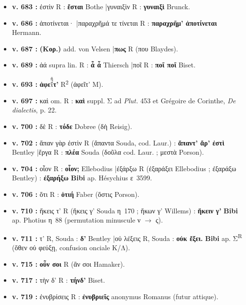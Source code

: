 \documentclass[10pt, a4paper, twoside]{book}
\renewcommand{\_}{\origunderscore\penalty0\relax}
\providecommand{\italique}[1]{\emph{#1}}
\providecommand{\lecon}[1]{\textbf{#1}}
\providecommand{\expo}[1]{\textsuperscript{#1}}
\providecommand{\Rdeux}{R\expo{2}}
\providecommand{\Mon}{M}
\providecommand{\espApp}{\hspace{0.5em}|\hspace{0.5em}}
\providecommand{\auDessus}[2]{\ensuremath{\overset{\text{#2}}{\text{#1}}}}
\begin{document}
\begin{itemize}
\begin{itemize}
    \item \textbf{v. 683 :} ἐστὶν R : \lecon{ἔσται} Bothe \espApp γυναιξὶν R : \lecon{γυναιξὶ} Brunck.
    \item \textbf{v. 686 :} ἀποτίνεται· \espApp παραχρῆμά τε τίνεται R : \lecon{παραχρῆμ' ἀποτίνεται} Hermann.
    \item \textbf{v. 687 :} \lecon{(Κορ.)} add. von Velsen \espApp \lecon{πως} R (που Blaydes).
    \item \textbf{v. 689 :} ἀά supra lin. R : \lecon{ἆ ἆ} Thiersch \espApp ποῖ R : \lecon{ποῖ ποῖ} Biset.
    \item \textbf{v. 693 :} \lecon{ἀφε\auDessus{ῖ}{ῆ}τ'} \Rdeux{} (ἀφεῖτ' \Mon{}).
    \item \textbf{v. 697 :} καὶ om. R : \lecon{καὶ} suppl. Σ ad \italique{Plut.} 453 et Grégoire de Corinthe, \italique{De dialectis}, p. 22.
    \item \textbf{v. 700 :} δὲ R : \lecon{τόδε} Dobree (δὴ Reisig).
    \item \textbf{v. 702 :} ἅπαν γὰρ ἐστὶν R (ἅπαντα Souda, cod. Laur.) : \lecon{ἅπαντ' ἄρ' ἐστὶ} Bentley \espApp ἔργα R : \lecon{πλέα} Souda (δοῦλα cod. Laur. ; μεστὰ Porson).
    \item \textbf{v. 704 :} οἷον R : \lecon{οἷον;} Ellebodius \espApp ἐξάρξω R (ἐξαράξει Ellebodius ; ἐξαράξω Bentley) : \lecon{ἐξαρήξω} \lecon{Bibi} ap. Hésychius ε~3599.
    \item \textbf{v. 706 :} ὅτι R : \lecon{ὁτιή} Faber (ὅστις Porson).
    \item \textbf{v. 710 :} ἥκεις τ' R (ἥκεις γ' Souda η~170 ; ἥκων γ' Willems) : \lecon{ἥκειν γ'} \lecon{Bibi} ap. Photius η~88 (permutation minuscule ν $\to$ ς).
    \item \textbf{v. 711 :} τ' R, Souda : \lecon{δ'} Bentley \espApp οὐ λέξεις R, Souda : \lecon{οὐκ ἔξει.} \lecon{Bibi} ap. Σ\textsuperscript{R} (ὅθεν οὐ φεύξῃ, confusion onciale Κ/Λ).
    \item \textbf{v. 715 :} \lecon{οὖν σοι} R (ἂν σοι Hamaker).
    \item \textbf{v. 717 :} τὴν δ' R : \lecon{τήνδ'} Biset.
    \item \textbf{v. 719 :} ἐνυβρίσεις R : \lecon{ἐνυβριεῖς} anonymus Romanus (futur attique).
  \end{itemize}
\end{itemize}
\end{document}
